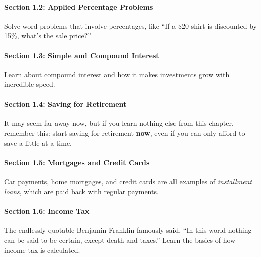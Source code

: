 \paragraph{Section 1.2: Applied Percentage Problems} Solve word problems that involve percentages, like ``If a \$20 shirt is discounted by 15\%, what's the sale price?''

\paragraph{Section 1.3: Simple and Compound Interest} Learn about compound interest and how it makes investments grow with incredible speed.

\paragraph{Section 1.4: Saving for Retirement} It may seem far away now, but if you learn nothing else from this chapter, remember this: start saving for retirement \textbf{now}, even if you can only afford to save a little at a time.

\paragraph{Section 1.5: Mortgages and Credit Cards} Car payments, home mortgages, and credit cards are all examples of \textit{installment loans}, which are paid back with regular payments.

\paragraph{Section 1.6: Income Tax} The endlessly quotable Benjamin Franklin famously said, ``In this world nothing can be said to be certain, except death and taxes.''  Learn the basics of how income tax is calculated.